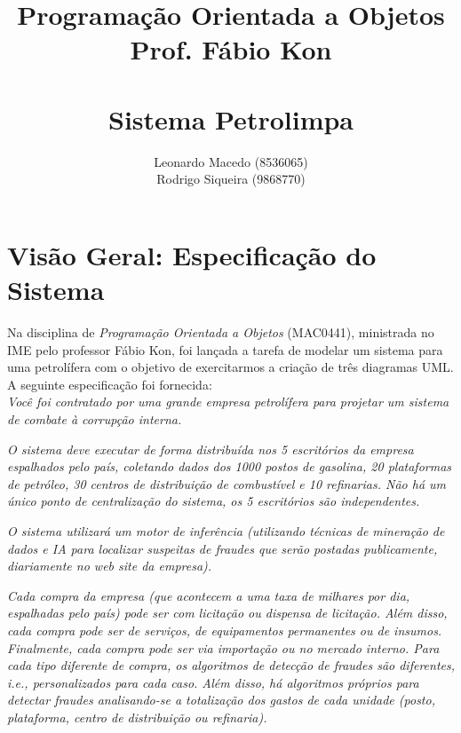 \documentclass[a4paper,10pt]{article}
\title{
  Programação Orientada a Objetos\\
  Prof. Fábio Kon\\ ~\\
  \textbf{Sistema Petrolimpa}
}
\author{
  Leonardo Macedo (8536065)\\
  Rodrigo Siqueira (9868770)\\
}
\begin{document}
\maketitle
\titlepage

\tableofcontents
\newpage


\section{Visão Geral: Especificação do Sistema}

Na disciplina de \emph{Programação Orientada a Objetos} (MAC0441), ministrada no IME
pelo professor Fábio Kon, foi lançada a tarefa de modelar um sistema para uma
petrolífera com o objetivo de exercitarmos a criação de três diagramas UML. A seguinte
especificação foi fornecida: ~\\

\emph{Você foi contratado por uma grande empresa petrolífera para projetar um
sistema de combate à corrupção interna.} \par

\emph{O sistema deve executar de forma distribuída nos 5 escritórios da empresa
espalhados pelo país, coletando dados dos 1000 postos de gasolina, 20
plataformas de petróleo, 30 centros de distribuição de combustível e 10
refinarias. Não há um único ponto de centralização do sistema, os 5 escritórios
são independentes.} \par

\emph{O sistema utilizará um motor de inferência (utilizando técnicas de
mineração de dados e IA para localizar suspeitas de fraudes que serão postadas
publicamente, diariamente no web site da empresa).} \par

\emph{Cada compra da empresa (que acontecem a uma taxa de milhares por dia,
espalhadas pelo país) pode ser com licitação ou dispensa de licitação. Além
disso, cada compra pode ser de serviços, de equipamentos permanentes ou de
insumos. Finalmente, cada compra pode ser via importação ou no mercado interno.
Para cada tipo diferente de compra, os algoritmos de detecção de fraudes são
diferentes, i.e., personalizados para cada caso. Além disso, há algoritmos
próprios para detectar fraudes analisando-se a totalização dos gastos de cada
unidade (posto, plataforma, centro de distribuição ou refinaria).} \par
\end{document}
